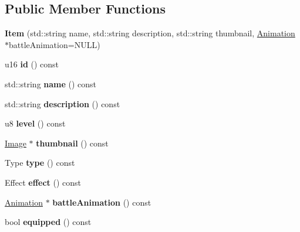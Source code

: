 \subsection*{Public Member Functions}
\begin{DoxyCompactItemize}
\item 
\hypertarget{classItem_af8a1515f17080bec7940bdef6afafab5}{{\bfseries Item} (std\-::string name, std\-::string description, std\-::string thumbnail, \hyperlink{classAnimation}{Animation} $\ast$battle\-Animation=N\-U\-L\-L)}\label{classItem_af8a1515f17080bec7940bdef6afafab5}

\item 
\hypertarget{classItem_a151c5fe4902cd18e9b6c626937b4f1be}{u16 {\bfseries id} () const }\label{classItem_a151c5fe4902cd18e9b6c626937b4f1be}

\item 
\hypertarget{classItem_a62d8706352487c714000dfa42fb85153}{std\-::string {\bfseries name} () const }\label{classItem_a62d8706352487c714000dfa42fb85153}

\item 
\hypertarget{classItem_ad0a39f99a07d27ab7722594391e925a4}{std\-::string {\bfseries description} () const }\label{classItem_ad0a39f99a07d27ab7722594391e925a4}

\item 
\hypertarget{classItem_ae30448a5d46a1fb23b9bcde8d69d889e}{u8 {\bfseries level} () const }\label{classItem_ae30448a5d46a1fb23b9bcde8d69d889e}

\item 
\hypertarget{classItem_a1aa25d266f64a06c33bca2cf81c7b788}{\hyperlink{classImage}{Image} $\ast$ {\bfseries thumbnail} () const }\label{classItem_a1aa25d266f64a06c33bca2cf81c7b788}

\item 
\hypertarget{classItem_a52f2ca0ac7fe825e121a9c90143e6c42}{Type {\bfseries type} () const }\label{classItem_a52f2ca0ac7fe825e121a9c90143e6c42}

\item 
\hypertarget{classItem_a351901f73a9053ffb4c9ba8c8f63662b}{Effect {\bfseries effect} () const }\label{classItem_a351901f73a9053ffb4c9ba8c8f63662b}

\item 
\hypertarget{classItem_a245c041c1b2156a4208af87743785454}{\hyperlink{classAnimation}{Animation} $\ast$ {\bfseries battle\-Animation} () const }\label{classItem_a245c041c1b2156a4208af87743785454}

\item 
\hypertarget{classItem_a8173f9b1a560cc3225925fdcd85ea514}{bool {\bfseries equipped} () const }\label{classItem_a8173f9b1a560cc3225925fdcd85ea514}


\end{DoxyCompactItemize}
